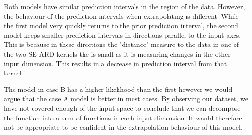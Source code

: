 \documentclass[11pt]{article}
\begin{document}
Both models have similar prediction intervals in the region of the data. However, the behaviour of the prediction intervals when extrapolating is different. While the first model very quickly returns to the prior prediction interval, the second model keeps smaller prediction intervals in directions parallel to the input axes. This is because in these directions the "distance" measure to the data in one of the two SE-ARD kernels the is small as it is measuring changes in the other input dimension. This results in a decrease in prediction interval from that kernel. 

The model in case B has a higher likelihood than the first however we would argue that the case A model is better in most cases. By observing our dataset, we have not covered enough of the input space to conclude that we can decompose the function into a sum of functions in each input dimension. It would therefore not be appropriate to be confident in the extrapolation behaviour of this model.




    
\end{document}
